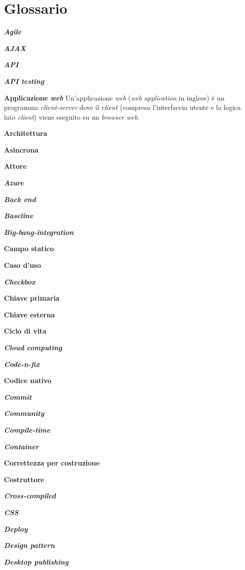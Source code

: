 \chapter{Glossario} \label{gloss}

\textbf{\textit{Agile}}

\textbf{\textit{AJAX}}

\textbf{\textit{API}}

\textbf{\textit{API testing}}

\textbf{Applicazione \textit{web}} Un'applicazione \textit{web} (\textit{web application} in inglese) è un programma \textit{client-server} dove il \textit{client} (compresa l'interfaccia utente e la logica lato \textit{client}) viene eseguito su un \textit{browser web}.

\textbf{Architettura}

\textbf{Asincrona}

\textbf{Attore}

\textbf{\textit{Azure}}

\textbf{\textit{Back end}}

\textbf{\textit{Baseline}}

\textbf{\textit{Big-bang-integration}}

\textbf{Campo statico}

\textbf{Caso d'uso}

\textbf{\textit{Checkbox}}

\textbf{Chiave primaria}

\textbf{Chiave esterna}

\textbf{Ciclo di vita}

\textbf{\textit{Cloud computing}}

\textbf{\textit{Code-n-fix}}

\textbf{Codice nativo}

\textbf{\textit{Commit}}

\textbf{\textit{Community}}

\textbf{\textit{Compile-time}}

\textbf{\textit{Container}}

\textbf{Correttezza per costruzione}

\textbf{Costruttore}

\textbf{\textit{Cross-compiled}}

\textbf{\textit{CSS}}

\textbf{\textit{Deploy}}

\textbf{\textit{Design pattern}}

\textbf{\textit{Desktop publishing}}

